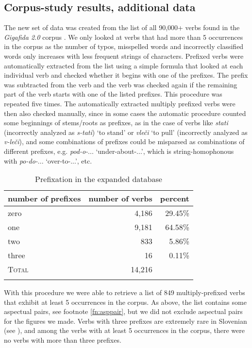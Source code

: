 \documentclass[output=paper,colorlinks,citecolor=brown]{langscibook}
\begin{document}
\subsection{Corpus-study results, additional data}\label{sec:corpusResults1}

The new set of data was created from the list of all 90,000+ verbs found in the \textit{Gigafida 2.0} corpus \citep{gigafida_glagoli}. We only looked at verbs that had more than 5 occurrences in the corpus as the number of typos, misspelled words and incorrectly classified words only increases with less frequent strings of characters. Prefixed verbs were automatically extracted from the list using a simple formula that looked at each individual verb and checked whether it begins with one of the prefixes. The prefix was subtracted from the verb and the verb was checked again if the remaining part of the verb starts with one of the listed prefixes. This procedure was repeated five times. The automatically extracted multiply prefixed verbs were then also checked manually, since in some cases the automatic procedure counted some beginnings of stems/roots as prefixes, as in the case of verbs like \textit{stati} (incorrectly analyzed as \textit{s-tati}) `to stand' or \textit{vleči} `to pull' (incorrectly analyzed as \textit{v-leči}), and some combinations of prefixes could be misparsed as combinations of different prefixes, e.g. \textit{pod-o-}... `under-about-...', which is string-homophonous with \textit{po-do-}... `over-to-...', etc. 

\begin{table}
\centering 
\begin{tabular}{ l r r  }
 \lsptoprule
 { number of prefixes}  &  {number of verbs}  &  {percent} \\
 \midrule
zero & 4,186 & 29.45\% \\ 
 one  & 9,181 & 64.58\% \\
 two & 833 & 5.86\% \\
 three & 16 & 0.11\% \\
 \midrule
 \textsc{Total} & 14,216 & \\ 
 \lspbottomrule
\end{tabular}
\caption{Prefixation in the expanded database}
    \label{tab:prefixExtraWeSoSlav}
\end{table}

With this procedure we were able to retrieve a list of 849 multiply-prefixed verbs that exhibit at least 5 occurrences in the corpus. As above, the list contains some aspectual pairs, see footnote \ref{fn:asppair}, but we did not exclude aspectual pairs for the figures we made. Verbs with three prefixes are extremely rare in Slovenian (see ), and among the verbs with at least 5 occurrences in the corpus, there were no verbs with more than three prefixes. 
\end{document}
